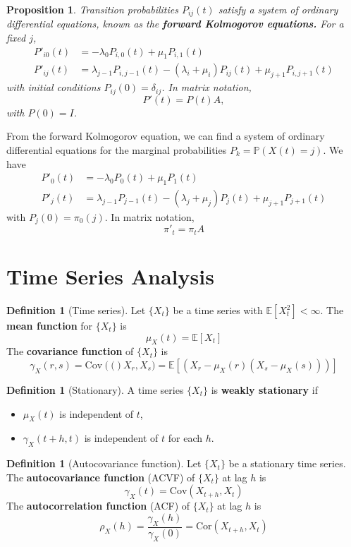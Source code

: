 \documentclass[10pt, oneside, reqno]{amsart}
\theoremstyle{plain}%
\newtheorem{prop}[thm]{Proposition}
\theoremstyle{definition}
\newtheorem{defn}[thm]{Definition}
\theoremstyle{remark}
\newcommand{\expc}[1]{\mathbb{E}\left[#1\right]}
\newcommand{\cov}[1]{\text{Cov}\left(#1\right)}
\newcommand{\prob}[1]{\mathbb{P}(#1)}
\newcommand{\ts}[1]{\{ #1 \}}
\begin{document}
\begin{prop}
	Transition probabilities $P_{ij}(t)$ satisfy a system of ordinary differential equations, known as the \textbf{forward Kolmogorov equations.}  For a fixed $j$, 
	\begin{align*}
		P'_{i0}(t) &= -\lambda_0 P_{i,0}(t) + \mu_1 P_{i,1}(t) \\
		P'_{ij}(t) &= \lambda_{j-1} P_{i,j-1}(t) - (\lambda_i + \mu_i)P_{ij}(t) + \mu_{j+1} P_{i,j+1}(t)
	\end{align*} with initial conditions $P_{ij}(0) = \delta_{ij}$.  In matrix notation, \[
		P'(t)  = P(t)A,
	\] with $P(0) = I$.
\end{prop}

From the forward Kolmogorov equation, we can find a system of ordinary differential equations for the marginal probabilities $P_k = \prob{X(t) = j}$.  We have \begin{align*}
	P'_0(t) &= - \lambda_0 P_0(t) + \mu_1 P_1(t) \\
	P'_j(t) &= \lambda_{j-1}P_{j-1}(t) - (\lambda_j + \mu_j) P_j(t) + \mu_{j+1}P_{j+1}(t)
\end{align*} with $P_j(0) = \pi_0(j)$.  In matrix notation, \[
	\pi'_t = \pi_t A
\]
\clearpage

\section{Time Series Analysis} %
\label{sec:time_series_analysis}

\begin{defn}[Time series]
	Let $\ts{X_t}$ be a time series with $\expc{X_t^2} < \infty$.  The \textbf{mean function} for $\ts{X_t}$ is \[
		\mu_X(t) = \expc{X_t}
	\]
	The \textbf{covariance function} of $\ts{X_t}$ is \[
		\gamma_X(r,s) = \cov(X_r, X_s) = \expc{(X_r - \mu_X(r)(X_s - \mu_X(s)))}
	\]
\end{defn}

\begin{defn}[Stationary]
	A time series $\ts{X_t}$ is \textbf{weakly stationary} if 
	\begin{itemize}
		\item $\mu_X(t)$ is independent of $t$,
		\item $\gamma_X(t+h,t)$ is independent of $t$ for each $h$.
	\end{itemize}
\end{defn}

\begin{defn}[Autocovariance function]
	Let $\ts{X_t}$ be a stationary time series.  The \textbf{autocovariance function} (ACVF) of $\ts{X_t}$ at lag $h$ is \[
		\gamma_X(t) = \cov{X_{t+h}, X_t}
	\]
	The \textbf{autocorrelation function} (ACF) of $\ts{X_t}$ at lag $h$ is \[
		\rho_X(h) = \frac{\gamma_X(h)}{\gamma_X(0)} = \text{Cor}({X_{t+h}, X_t})
	\]
\end{defn}
\end{document}
